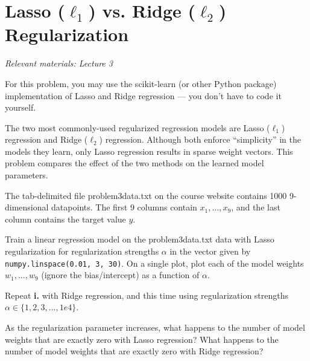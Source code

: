 \newpage
\section{Lasso (\texorpdfstring{$\ell_1$}{L1}) vs. Ridge (\texorpdfstring{$\ell_2$}{L2}) Regularization}
\textit{Relevant materials: Lecture 3}

For this problem, you may use the scikit-learn (or other Python package) implementation of Lasso and Ridge regression --- you don't have to code it yourself.

The two most commonly-used regularized regression models are Lasso ($\ell_1$) regression and Ridge ($\ell_2$) regression.
Although both enforce ``simplicity'' in the models they learn, only Lasso regression results in sparse weight vectors.
This problem compares the effect of the two methods on the learned model parameters.

\problem[12] 
The tab-delimited file problem3data.txt on the course website contains 1000 9-dimensional datapoints.  The first 9 columns contain $x_1,\ldots,x_9$, and the last column contains the target value $y$.

\subproblem
Train a linear regression model on the problem3data.txt data with Lasso regularization for regularization strengths $\alpha$ in the vector given by \texttt{numpy.linspace(0.01, 3, 30)}.
On a single plot, plot each of the model weights $w_1, ..., w_9$ (ignore the bias/intercept) as a function of $\alpha$.

\subproblem
Repeat \textbf{i.} with Ridge regression, and this time using regularization strengths $\alpha \in \{1, 2, 3, \ldots, 1e4\}$.


\subproblem
As the regularization parameter increases, what happens to the number of model weights that are exactly zero with Lasso regression?
What happens to the number of model weights that are exactly zero with Ridge regression?

\medskip
\lstset{
  basicstyle=\small\ttfamily,
  breaklines=true,
  columns=fullflexible
}


